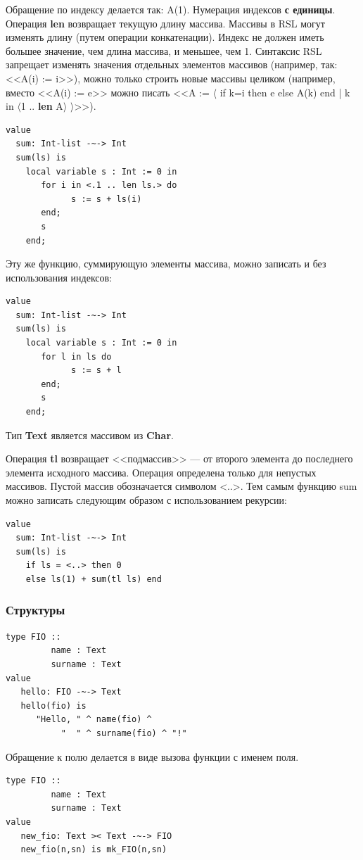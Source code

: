 \documentclass[14pt, twoside]{extreport}
\newcommand{\head}[1]{\vspace{1cm}\subsubsection*{#1}}
\begin{document}
Обращение по индексу делается так: A(1). Нумерация индексов \textbf{с единицы}. Операция \textbf{len} возвращает текущую длину массива. Массивы в RSL могут изменять длину (путем операции конкатенации). Индекс не должен иметь большее значение, чем длина массива, и меньшее, чем 1. Синтаксис RSL запрещает изменять значения отдельных элементов массивов (например, так: <<A(i) := i>>), можно только строить новые массивы целиком (например, вместо <<A(i) := e>> можно писать <<A := $\langle$ if k=i then e else A(k) end | k in $\langle$1 .. \textbf{len} A$\rangle$ $\rangle$>>).

\begin{lstlisting}
value
  sum: Int-list -~-> Int
  sum(ls) is
    local variable s : Int := 0 in
       for i in <.1 .. len ls.> do
             s := s + ls(i)
       end;
       s
    end;
\end{lstlisting}


Эту же функцию, суммирующую элементы массива, можно записать и без использования индексов:
\begin{lstlisting}
value
  sum: Int-list -~-> Int
  sum(ls) is
    local variable s : Int := 0 in
       for l in ls do
             s := s + l
       end;
       s
    end;
\end{lstlisting}

Тип \textbf{Text} является массивом из \textbf{Char}.

Операция \textbf{tl} возвращает <<подмассив>> --- от второго элемента до последнего элемента исходного массива. Операция определена только для непустых массивов. Пустой массив обозначается символом <..>. Тем самым функцию sum можно записать следующим образом с использованием рекурсии:
\begin{lstlisting}
value
  sum: Int-list -~-> Int
  sum(ls) is
    if ls = <..> then 0
    else ls(1) + sum(tl ls) end
\end{lstlisting}


\head{Структуры}
\begin{lstlisting}
type FIO ::
         name : Text
         surname : Text
value
   hello: FIO -~-> Text
   hello(fio) is
      "Hello, " ^ name(fio) ^
           "  " ^ surname(fio) ^ "!"
\end{lstlisting}

Обращение к полю делается в виде вызова функции с именем поля.

\begin{lstlisting}
type FIO ::
         name : Text
         surname : Text
value
   new_fio: Text >< Text -~-> FIO
   new_fio(n,sn) is mk_FIO(n,sn)
\end{lstlisting}
\end{document}
